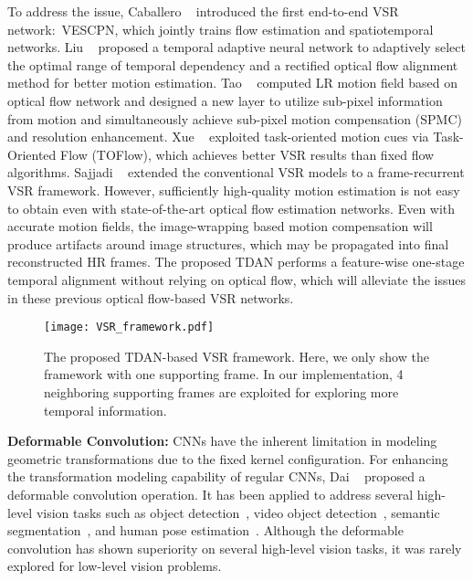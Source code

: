 \documentclass[10pt,twocolumn,letterpaper]{article}
\begin{document}
To address the issue, Caballero \etal~\cite{caballero2017real} introduced the first end-to-end VSR network:~VESCPN, which jointly trains flow estimation and spatiotemporal networks. Liu \etal~\cite{liu2017robust} proposed a temporal adaptive neural network to adaptively select the optimal range of temporal dependency and a rectified optical flow alignment method for better motion estimation. Tao \etal~\cite{tao2017detail} computed LR motion field based on optical flow network and designed a new layer to utilize sub-pixel information from motion and simultaneously achieve sub-pixel motion compensation (SPMC) and resolution enhancement. Xue \etal~\cite{xue2017video} exploited task-oriented motion cues via Task-Oriented Flow (TOFlow), which achieves better VSR results than fixed flow algorithms. Sajjadi \etal~\cite{sajjadi2018frame} extended the conventional VSR models to a frame-recurrent VSR framework.
However, sufficiently high-quality motion estimation is not easy to obtain even with state-of-the-art optical flow estimation networks. Even with accurate motion fields, the image-wrapping based motion compensation will produce artifacts around image structures, which may be propagated into final reconstructed HR frames. The proposed TDAN performs a feature-wise one-stage temporal alignment without relying on optical flow, which will alleviate the issues in these previous optical flow-based VSR networks.


\begin{figure*}
  \centering
    \texttt{[image: VSR\_framework.pdf]}
    \caption{The proposed TDAN-based VSR framework. Here, we only show the framework with one supporting frame. In our implementation, 4 neighboring supporting frames are exploited for exploring more temporal information.}
\label{framework}
\end{figure*}


\vspace{2mm}
\noindent \textbf{Deformable Convolution:}
CNNs have the inherent limitation in modeling geometric transformations due to the fixed kernel configuration. For enhancing the transformation modeling capability of regular CNNs, Dai \etal~\cite{Dai_2017_ICCV} proposed a deformable convolution operation. It has been applied to address several high-level vision tasks such as object detection~\cite{Dai_2017_ICCV}, video object detection~\cite{Bertasius_2018_ECCV}, semantic segmentation~\cite{Dai_2017_ICCV}, and human pose estimation~\cite{Sun_2018_ECCV}.
Although the deformable convolution has shown superiority on several high-level vision tasks, it was rarely explored for low-level vision problems.
\end{document}
